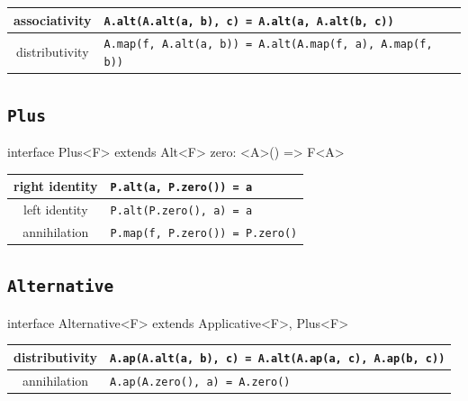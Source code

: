 \documentclass[12pt]{article}
\theoremstyle{definition}
\newenvironment{code}
  {\vspace{0.5cm} \VerbatimEnvironment\begin{typescriptcode}}
  {\end{typescriptcode} \vspace{0.2cm}}
\begin{document}
\begin{center}
\bgroup
\def\arraystretch{1.5}
\begin{tabular}{ |c|p{10cm}| }
\hline
associativity & \texttt{A.alt(A.alt(a, b), c) = A.alt(a, A.alt(b, c))} \\
\hline
distributivity & \texttt{A.map(f, A.alt(a, b)) = A.alt(A.map(f, a), A.map(f, b))} \\
\hline
\end{tabular}
\egroup
\end{center}

\subsection{\texttt{Plus}}

\begin{code}
interface Plus<F> extends Alt<F> {
  zero: <A>() => F<A>
}
\end{code}

\begin{center}
\bgroup
\def\arraystretch{1.5}
\begin{tabular}{ |c|p{10cm}| }
\hline
right identity & \texttt{P.alt(a, P.zero()) = a} \\
\hline
left identity & \texttt{P.alt(P.zero(), a) = a} \\
\hline
annihilation & \texttt{P.map(f, P.zero()) = P.zero()} \\
\hline
\end{tabular}
\egroup
\end{center}

\subsection{\texttt{Alternative}}

\begin{code}
interface Alternative<F> extends Applicative<F>, Plus<F> {}
\end{code}

\begin{center}
\bgroup
\def\arraystretch{1.5}
\begin{tabular}{ |c|p{10cm}| }
\hline
distributivity & \texttt{A.ap(A.alt(a, b), c) = A.alt(A.ap(a, c), A.ap(b, c))} \\
\hline
annihilation & \texttt{A.ap(A.zero(), a) = A.zero()} \\
\hline
\end{tabular}
\egroup
\end{center}
\end{document}
